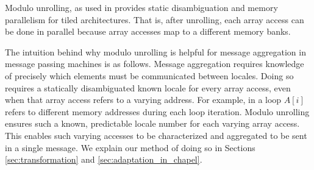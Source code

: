 Modulo unrolling, as used in \cite{barua1999maps} provides static disambiguation and memory parallelism for tiled architectures. That is, after unrolling, each array access can be done in parallel because array accesses map to a different memory banks. 

The intuition behind why modulo unrolling is helpful for message aggregation in message passing machines is as follows.  Message aggregation requires knowledge of precisely which elements must be communicated between locales.  Doing so requires a statically disambiguated known locale for every array access, even when that array access refers to a varying address. For example, in a loop $A[i]$ refers to different memory addresses during each loop iteration. Modulo unrolling ensures such a known, predictable locale number for each varying array access. This enables such varying accesses to be characterized and aggregated to be sent in a single message. We explain our method of doing so in Sections \ref{sec:transformation} and \ref{sec:adaptation_in_chapel}.